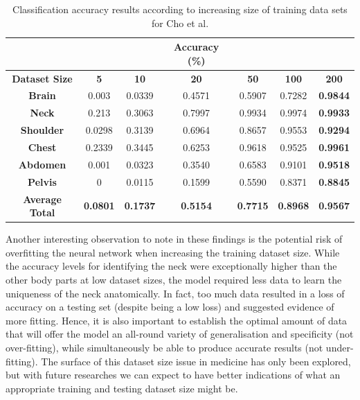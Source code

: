 \documentclass[a4paper]{article}
\begin{document}
        \begin{table}[!h]
            \centering
                \begin{tabular}{||c c c c c c c||} 
                \hline
                & & & \textbf{Accuracy (\%)} & & & \\
                \hline
                \textbf{Dataset Size} & \textbf{5} & \textbf{10} & \textbf{20} & \textbf{50} & \textbf{100} & \textbf{200} \\ 
                \hline\hline
                \textbf{Brain} & 0.003 & 0.0339 & 0.4571 & 0.5907 & 0.7282 & \textbf{0.9844} \\
                \hline
                \textbf{Neck} & 0.213 & 0.3063 & 0.7997 & 0.9934 & 0.9974 & \textbf{0.9933} \\
                \hline
                \textbf{Shoulder} & 0.0298 & 0.3139 & 0.6964 & 0.8657 & 0.9553 & \textbf{0.9294} \\
                \hline
                \textbf{Chest} & 0.2339 & 0.3445 & 0.6253 & 0.9618 & 0.9525 & \textbf{0.9961} \\
                \hline
                \textbf{Abdomen} & 0.001 & 0.0323 & 0.3540 & 0.6583 & 0.9101 & \textbf{0.9518} \\
                \hline
                \textbf{Pelvis} & 0 & 0.0115 & 0.1599 & 0.5590 & 0.8371 & \textbf{0.8845} \\
                \hline
                \textbf{Average Total} & \textbf{0.0801} & \textbf{0.1737} & \textbf{0.5154} & \textbf{0.7715} & \textbf{0.8968} & \textbf{0.9567} \\
                \hline
                \end{tabular}
            \caption{\label{fig:4} Classification accuracy results according to increasing size of training data sets for Cho et al.}
        \end{table}

        Another interesting observation to note in these findings is the potential risk of overfitting the neural network when increasing the training dataset size. While the accuracy levels for identifying the neck were exceptionally higher than the other body parts at low dataset sizes, the model required less data to learn the uniqueness of the neck anatomically. In fact, too much data resulted in a loss of accuracy on a testing set (despite being a low loss) and suggested evidence of more fitting. Hence, it is also important to establish the optimal amount of data that will offer the model an all-round variety of generalisation and specificity (not over-fitting), while simultaneously be able to produce accurate results (not under-fitting). The surface of this dataset size issue in medicine has only been explored, but with future researches we can expect to have better indications of what an appropriate training and testing dataset size might be.
        \vspace{3mm}
\end{document}
